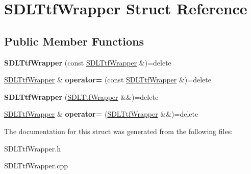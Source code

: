 \hypertarget{struct_s_d_l_ttf_wrapper}{}\section{S\+D\+L\+Ttf\+Wrapper Struct Reference}
\label{struct_s_d_l_ttf_wrapper}
\subsection*{Public Member Functions}
\begin{DoxyCompactItemize}
\item 
\mbox{\label{struct_s_d_l_ttf_wrapper_a4a4a7ca48ec8afc01fcd3f3a2109bc1c}} 
{\bfseries S\+D\+L\+Ttf\+Wrapper} (const \mbox{\hyperlink{struct_s_d_l_ttf_wrapper}{S\+D\+L\+Ttf\+Wrapper}} \&)=delete
\item 
\mbox{\label{struct_s_d_l_ttf_wrapper_a97d4dd16c49c1a4e1bc7bb758622d588}} 
\mbox{\hyperlink{struct_s_d_l_ttf_wrapper}{S\+D\+L\+Ttf\+Wrapper}} \& {\bfseries operator=} (const \mbox{\hyperlink{struct_s_d_l_ttf_wrapper}{S\+D\+L\+Ttf\+Wrapper}} \&)=delete
\item 
\mbox{\label{struct_s_d_l_ttf_wrapper_a80ece38fa95fcf6dd75d5d73c07e3280}} 
{\bfseries S\+D\+L\+Ttf\+Wrapper} (\mbox{\hyperlink{struct_s_d_l_ttf_wrapper}{S\+D\+L\+Ttf\+Wrapper}} \&\&)=delete
\item 
\mbox{\label{struct_s_d_l_ttf_wrapper_aeded0320e928421f2d7098a29a4f54e9}} 
\mbox{\hyperlink{struct_s_d_l_ttf_wrapper}{S\+D\+L\+Ttf\+Wrapper}} \& {\bfseries operator=} (\mbox{\hyperlink{struct_s_d_l_ttf_wrapper}{S\+D\+L\+Ttf\+Wrapper}} \&\&)=delete
\end{DoxyCompactItemize}


The documentation for this struct was generated from the following files\+:\begin{DoxyCompactItemize}
\item 
S\+D\+L\+Ttf\+Wrapper.\+h\item 
S\+D\+L\+Ttf\+Wrapper.\+cpp\end{DoxyCompactItemize}
